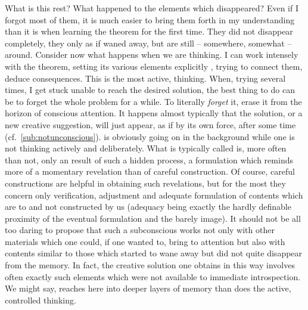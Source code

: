 \pa What is this rest? What happened to the elements which disappeared? Even if
I forgot most of them, it is much easier to bring them forth in my understanding
than it is when learning the theorem for the first time. They did not disappear
completely, they only as if waned away, but are still -- somewhere, somewhat --
around. Consider now what happens when we are thinking. I can work intensely
with the theorem, setting its various elements explicitly ,
trying to connect them, deduce consequences. This is the most active,
 thinking. When, trying several times, I get stuck unable to reach
the desired solution, the best thing to do can be to forget the whole problem
for a while. To literally {\em forget} it, erase it from the horizon of
conscious attention. It happens almost typically that the solution, or a new
creative suggestion, will just appear, as if by its own force, after some time
(cf.~\ref{sub:notunconscious}).  is obviously going on in the
background while one is not thinking actively and deliberately. What is
typically called  is, more often than not, only an 
result of such a hidden process, a  formulation which
reminds more of a momentary revelation than of careful construction. Of course,
careful constructions are helpful in obtaining such revelations, but for the
most they concern only verification, adjustment and adequate formulation of
 contents which are  to and not constructed by us (adequacy
being exactly the hardly definable proximity of the eventual formulation and the
barely  image). 
It should not be all too daring to propose that such a subconscious
 works not only with other materials which one could, if one
wanted to, bring to  attention but also with contents similar to
those which started to wane away but did not quite disappear from the memory. In
fact, the creative solution one obtains in this way involves often exactly such
elements which were not available to immediate introspection. We might say,
 reaches here into deeper layers of memory than does the active,
 controlled thinking.

